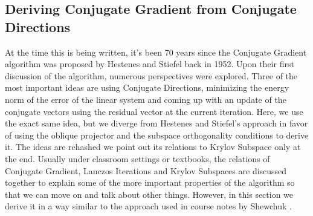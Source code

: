 \documentclass[]{article}
\theoremstyle{definition}
\begin{document}
    \subsection{Deriving Conjugate Gradient from Conjugate Directions}
        At the time this is being written, it's been 70 years since the Conjugate Gradient algorithm was proposed by Hestenes and Stiefel back in 1952\cite{paper:cg_original}. Upon their first discussion of the algorithm, numerous perspectives were explored. Three of the most important ideas are using Conjugate Directions, minimizing the energy norm of the error of the linear system and coming up with an update of the conjugate vectors using the residual vector at the current iteration. Here, we use the exact same idea, but we diverge from Hestenes and Stiefel's approach in favor of using the oblique projector and the subspace orthogonality conditions to derive it. The ideas are rehashed we point out its relations to Krylov Subspace only at the end. Usually under classroom settings or textbooks, the relations of Conjugate Gradient, Lanczos Iterations and Krylov Subspaces are discussed together to explain some of the more important properties of the algorithm so that we can move on and talk about other things. However, in this section we derive it in a way similar to the approach used in course notes by Shewchuk \cite{notes:painless_cg}. 
\end{document}
